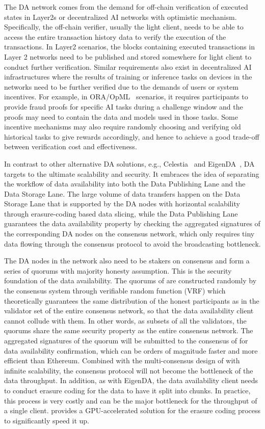 The \project DA network comes from the demand for off-chain verification of executed states in Layer2s or decentralized AI networks with optimistic mechanism. 
Specifically, the off-chain verifier, usually the light client, needs to be able to access the entire transaction history data to verify the execution of the transactions.
In Layer2 scenarios, the blocks containing executed transactions in Layer 2 networks need to be published and stored somewhere for light client to conduct further verification.
Similar requirements also exist in decentralized AI infrastructures where the results of training or inference tasks on devices in the networks need to be further verified due to the demands of users or system incentives. 
For example, in ORA/OpML~\cite{opml} scenarios, it requires participants to provide fraud proofs for specific AI tasks during a challenge window and the proofs may need to contain the data and models used in those tasks. 
Some incentive mechanisms may also require randomly choosing and verifying old historical tasks to give rewards accordingly, and hence to achieve a good trade-off between verification cost and effectiveness. 

In contrast to other alternative DA solutions, e.g., Celestia~\cite{celestia} and EigenDA~\cite{eigenda}, \projabbrev DA targets to the ultimate scalability and security.
It embraces the idea of separating the workflow of data availability into both the Data Publishing Lane and the Data Storage Lane. 
The large volume of data transfers happen on the Data Storage Lane that is supported by the DA nodes with horizontal scalability through erasure-coding based data slicing, while the Data Publishing Lane guarantees the data availability property by checking the aggregated signatures of the corresponding DA nodes on the consensus network, which only requires tiny data flowing through the consensus protocol to avoid the broadcasting bottleneck. 

The DA nodes in the network also need to be stakers on \projabbrev consensus and form a series of quorums with majority honesty assumption. 
This is the security foundation of the data availability.
The quorums of \projabbrev are constructed randomly by the consensus system through verifiable random function (VRF) which theoretically guarantees the same distribution of the honest participants as in the validator set of the entire consensus network, so that the data availability client cannot collude with them.
In other words, as subsets of all the validators, the quorums share the same security property as the entire consensus network.
The aggregated signatures of the quorum will be submitted to the consensus of \projabbrev for data availability confirmation, which can be orders of magnitude faster and more efficient than Ethereum. 
Combined with the multi-consensus design of \projabbrev with infinite scalability, the consensus protocol will not become the bottleneck of the data throughput.
In addition, as with EigenDA, the data availability client needs to conduct erasure coding for the data to have it split into chunks. In practice, this process is very costly and can be the major bottleneck for the throughput of a single client. 
\projabbrev provides a GPU-accelerated solution for the erasure coding process to significantly speed it up.


